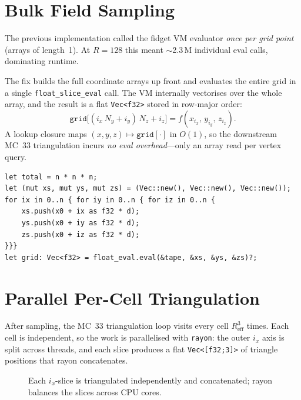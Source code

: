 \documentclass[11pt]{article}
\begin{document}
\section{Bulk Field Sampling}

The previous implementation called the fidget VM evaluator
\emph{once per grid point} (arrays of length~1).  At $R{=}128$
this meant $\sim$2.3\,M individual eval calls, dominating runtime.

The fix builds the full coordinate arrays up front and evaluates
the entire grid in a single \texttt{float\_slice\_eval} call.  The
VM internally vectorises over the whole array, and the result is a
flat \texttt{Vec<f32>} stored in row-major order:
\begin{equation}
  \texttt{grid}\bigl[(i_x\,N_y + i_y)\,N_z + i_z\bigr]
  = f(x_{i_x},\, y_{i_y},\, z_{i_z}).
\end{equation}
A lookup closure maps $(x,y,z)\mapsto \texttt{grid}[\cdot]$ in
$O(1)$, so the downstream MC~33 triangulation incurs \emph{no eval
overhead}---only an array read per vertex query.

\begin{lstlisting}
let total = n * n * n;
let (mut xs, mut ys, mut zs) = (Vec::new(), Vec::new(), Vec::new());
for ix in 0..n { for iy in 0..n { for iz in 0..n {
    xs.push(x0 + ix as f32 * d);
    ys.push(x0 + iy as f32 * d);
    zs.push(x0 + iz as f32 * d);
}}}
let grid: Vec<f32> = float_eval.eval(&tape, &xs, &ys, &zs)?;
\end{lstlisting}

\section{Parallel Per-Cell Triangulation}

After sampling, the MC~33 triangulation loop visits every cell
$R_{\text{eff}}^3$ times.  Each cell is independent, so the work is
parallelised with \texttt{rayon}: the outer $i_x$ axis is split
across threads, and each slice produces a flat \texttt{Vec<[f32;3]>}
of triangle positions that rayon concatenates.

\begin{figure}[h]
\centering
{}
\caption{Each $i_x$-slice is triangulated independently and
concatenated; rayon balances the slices across CPU cores.}
\label{fig:parallel}
\end{figure}
\end{document}
